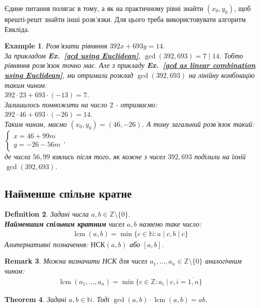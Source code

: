 \documentclass[a4paper, 14pt]{extarticle}
\theoremstyle{theoremdd}
\newtheorem{theorem}{Theorem}[subsection]
\theoremstyle{theoremdd}
\newtheorem{definition}[theorem]{Definition}
\theoremstyle{theoremdd}
\theoremstyle{theoremdd}
\newtheorem{example}[theorem]{Example}
\theoremstyle{theoremdd}
\theoremstyle{theoremdd}
\newtheorem{remark}[theorem]{Remark}
\theoremstyle{theoremdd}
\theoremstyle{theoremdd}
\DeclareMathOperator{\lcm}{lcm}
\newcommand\exref[1]{\textbf{Ex.~\ref{#1}}}
\begin{document}
Єдине питання полягає в тому, а як на практичному рівні знайти $(x_0,y_0)$, щоб врешті-решт знайти інші розв'язки. Для цього треба використовувати алгоритм Евкліда.

\begin{example}
Розв'язати рівняння $392x + 693y = 14$.\\
За прикладом \exref{gcd using Euclidean}, $\gcd(392,693) = 7 \mid 14$. Тобто рівняння розв'язок точно має. Але з прикладу \exref{gcd as linear combination using Euclidean}, ми отримали розклад $\gcd(392, 693)$ на лінійну комбінацію таким чином:\\
$392 \cdot 23 + 693 \cdot (-13) = 7$.\\
Залишилось помножити на число $2$ - отримаємо:\\
$392 \cdot 46 + 693 \cdot (-26) = 14$.\\
Таким чином, маємо $(x_0,y_0) = (46,-26)$. А тому загальний розв'язок такий:\\
$\begin{cases}
x = 46 + 99m \\
y = -26 - 56m
\end{cases}$,\\
де числа $56,99$ взялись після того, як кожне з чисел $392,693$ поділили на їхній $\gcd(392, 693)$.
\end{example}

\subsection{Найменше спільне кратне}
\begin{definition}
Задані числа $a,b \in \mathbb{Z} \setminus \{0\}$.\\
\textbf{Найменшим спільним кратним} чисел $a,b$ назвемо таке число:
\begin{align*}
\lcm(a,b) = \min \{c \in \mathbb{N}: a \mid c,b \mid c\}
\end{align*}
Альтернативні позначення: $\text{НСК}(a,b)$ або $[a,b]$.
\end{definition}

\begin{remark}
Можна визначити НСК для чисел $a_1,\dots,a_n \in \mathbb{Z} \setminus \{0\}$ аналогічним чином:
\begin{align*}
\lcm(a_1,\dots,a_n) = \min\{c \in \mathbb{Z}: a_i \mid c, i = \overline{1,n}\}
\end{align*}
\end{remark}

\begin{theorem}
Задані $a,b \in \mathbb{N}$. Тоді $\gcd(a,b) \cdot \lcm(a,b) = ab$.
\end{theorem}
\end{document}
